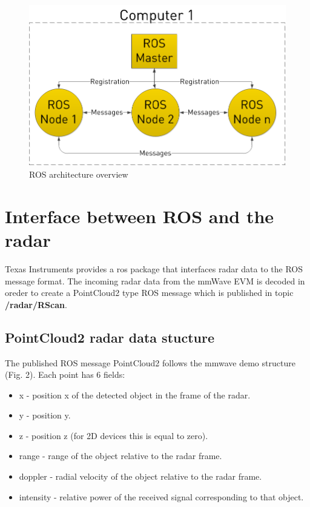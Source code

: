 \documentclass[12pt]{article}
\begin{document}
\begin{figure}[!htb]
    \centering
    \includegraphics[scale=0.25]{ros_graph.png}
    \caption{ROS architecture overview}
    \label{fig:ros_concepts}
\end{figure}
\section{Interface between ROS and the radar}
Texas Instruments provides a ros package that interfaces radar data to the ROS message format. The incoming radar data from the mmWave EVM is decoded in oreder to create a PointCloud2 type ROS message which is published in topic \textbf{/radar/RScan}.

\subsection{PointCloud2 radar data stucture}

The published ROS message PointCloud2 follows the mmwave demo structure (Fig. 2). Each point has 6 fields:
\begin{itemize}
\item x - position x of the detected  object in the frame of the radar.
\item y - position y.
\item z - position z (for 2D devices this is equal to zero).
\item range - range of the object relative to the radar frame.
\item doppler - radial velocity of the object relative to the radar frame.
\item intensity - relative power of the received signal corresponding to that object.
\end{itemize}
\end{document}
